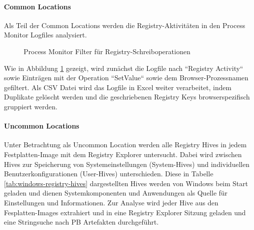 \paragraph*{Common Locations}
Als Teil der Common Locations werden die Registry-Aktivitäten in den Process Monitor Logfiles analysiert.
\begin{figure}[h!]
	\centerline{}
	\label{img:procmon-setvalue-filter}
	\caption{Process Monitor Filter für Registry-Schreiboperationen}
\end{figure}
Wie in Abbildung \ref{img:procmon-setvalue-filter} gezeigt, wird zunächst die Logfile nach ``Registry Activity`` sowie Einträgen mit der Operation ``SetValue`` sowie dem Browser-Prozessnamen gefiltert.
Als CSV Datei wird das Logfile in Excel weiter verarbeitet, indem Duplikate gelöscht werden und die geschriebenen Registry Keys browserspezifisch gruppiert werden.
	
\paragraph*{Uncommon Locations}
Unter Betrachtung als Uncommon Location werden alle Registry Hives in jedem Festplatten-Image mit dem Registry Explorer untersucht.
Dabei wird zwischen Hives zur Speicherung von Systemeinstellungen (System-Hives) und individuellen Benutzerkonfigurationen (User-Hives) unterschieden. Diese in Tabelle \ref{tab:windows-registry-hives} dargestellten Hives werden von Windows beim Start geladen und dienen Systemkomponenten und Anwendungen als Quelle für Einstellungen und Informationen.	
Zur Analyse wird jeder Hive aus den Fesplatten-Images extrahiert und in eine Registry Explorer Sitzung geladen und eine Stringsuche nach PB Artefakten durchgeführt.

